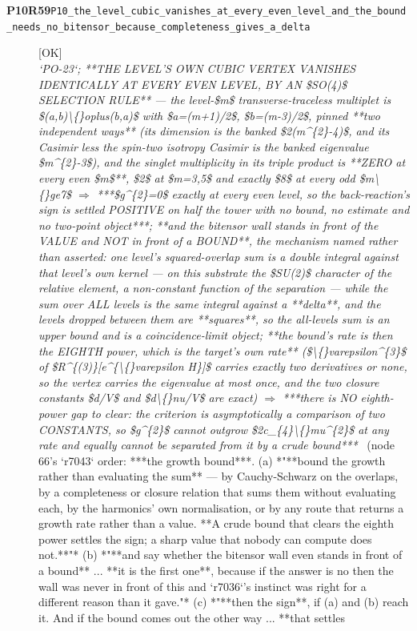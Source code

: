 \begin{description}
\item[\textbf{P10R59}\quad\texttt{P10\_the\_level\_cubic\_vanishes\_at\_every\_even\_level\_and\_the\_bound\_needs\_no\_bitensor\_because\_completeness\_gives\_a\_delta}]\hfill\textsf{[OK]}\\
\textit{`PO-23`;  **THE LEVEL'S OWN CUBIC VERTEX VANISHES IDENTICALLY AT EVERY EVEN LEVEL, BY AN \$SO(4)\$ SELECTION RULE** --- the level-\$m\$ transverse-traceless multiplet is \$(a,b)\textbackslash\{\}oplus(b,a)\$ with \$a=(m+1)/2\$, \$b=(m-3)/2\$, pinned **two independent ways** (its dimension is the banked \$2(m\textasciicircum{}\{2\}-4)\$, and its Casimir less the spin-two isotropy Casimir is the banked eigenvalue \$m\textasciicircum{}\{2\}-3\$), and the singlet multiplicity in its triple product is **ZERO at every even \$m\$**, \$2\$ at \$m=3,5\$ and exactly \$8\$ at every odd \$m\textbackslash\{\}ge7\$ \ensuremath{\Rightarrow} ***\$g\textasciicircum{}\{2\}=0\$ exactly at every even level, so the back-reaction's sign is settled POSITIVE on half the tower with no bound, no estimate and no two-point object***;  **and the bitensor wall stands in front of the VALUE and NOT in front of a BOUND**, the mechanism named rather than asserted: one level's squared-overlap sum is a double integral against that level's own kernel --- on this substrate the \$SU(2)\$ character of the relative element, a non-constant function of the separation --- while the sum over ALL levels is the same integral against a **delta**, and the levels dropped between them are **squares**, so the all-levels sum is an upper bound and is a coincidence-limit object;  **the bound's rate is then the EIGHTH power, which is the target's own rate** (\$\textbackslash\{\}varepsilon\textasciicircum{}\{3\}\$ of \$R\textasciicircum{}\{(3)\}[e\textasciicircum{}\{\textbackslash\{\}varepsilon H\}]\$ carries exactly two derivatives or none, so the vertex carries the eigenvalue at most once, and the two closure constants \$d/V\$ and \$d\textbackslash\{\}nu/V\$ are exact) \ensuremath{\Rightarrow} ***there is NO eighth-power gap to clear: the criterion is asymptotically a comparison of two CONSTANTS, so \$g\textasciicircum{}\{2\}\$ cannot outgrow \$2c\_\{4\}\textbackslash\{\}mu\textasciicircum{}\{2\}\$ at any rate and equally cannot be separated from it by a crude bound***} \ (node 66's `r7043` order: ***the growth bound***. (a) *"**bound the growth rather than evaluating the sum** --- by Cauchy-Schwarz on the overlaps, by a completeness or closure relation that sums them without evaluating each, by the harmonics' own normalisation, or by any route that returns a growth rate rather than a value. **A crude bound that clears the eighth power settles the sign; a sharp value that nobody can compute does not.**"* (b) *"**and say whether the bitensor wall even stands in front of a bound** ... **it is the first one**, because if the answer is no then the wall was never in front of this and `r7036`'s instinct was right for a different reason than it gave."* (c) *"**then the sign**, if (a) and (b) reach it. And if the bound comes out the other way ... **that settles 
\end{description}
